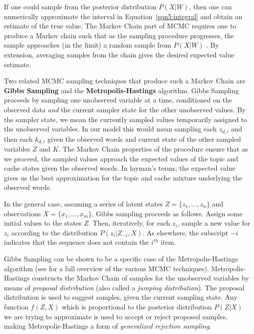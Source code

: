 \noindent If one could sample from the posterior distribution $P(X|W)$, then one can numerically approximate the interval in Equation~\ref{eqn5:integral} and obtain an estimate of the true value.  The Markov Chain part of MCMC requires one to produce a Markov chain such that as the sampling procedure progresses, the sample approaches (in the limit) a random sample from $P(X|W)$ \cite{brooks1998markov}.  By extension, averaging samples from the chain gives the desired expected value estimate.

Two related MCMC sampling techniques that produce such a Markov Chain are \textbf{Gibbs Sampling} and the \textbf{Metropolis-Hastings} algorithm.  Gibbs Sampling proceeds by sampling one unobserved variable at a time, conditioned on the observed data \textit{and} the current sampler state for the other unobserved values.   By the sampler state, we mean the currently sampled values temporarily assigned to the unobserved variables.  In our model this would mean sampling each $z_{d,i}$ and then each $k_{d,i}$ given the observed words and current state of the other sampled variables $Z$ and $K$.  The Markov Chain properties of the procedure ensure that as we proceed, the sampled values approach the expected values of the topic and cache states given the observed words.  In layman's terms, the expected value gives us the best approximation for the topic and cache mixture underlying the observed words.

In the general case, assuming a series of latent states $Z=\{z_1,\ldots,z_n\}$ and observations $X=\{x_1,\ldots,x_m\}$, Gibbs sampling proceeds as follows.   Assign some initial values to the states $Z$.  Then, iteratively, for each $z_i$, sample a new value for $z_i$ according to the distribution $P(z_i|Z_{-i},X)$.  As elsewhere, the subscript $-i$ indicates that the sequence does not contain the $i^{th}$ item. 

Gibbs Sampling can be shown to be a specific case of the Metropolis-Hastings algorithm (see \cite{brooks1998markov} for a full overview of the various MCMC techniques).   Metropolis-Hastings constructs the Markov Chain of samples for the unobserved variables by means of \textit{proposal distribution} (also called a \textit{jumping distribution}).  The proposal distribution is used to suggest samples, given the current sampling state.  Any function $f(Z,X)$ which is proportional to the posterior distribution $P(Z|X)$ we are trying to approximate is used to accept or reject proposed samples, making Metropolis-Hastings a form of \textit{generalized rejection sampling}.  

